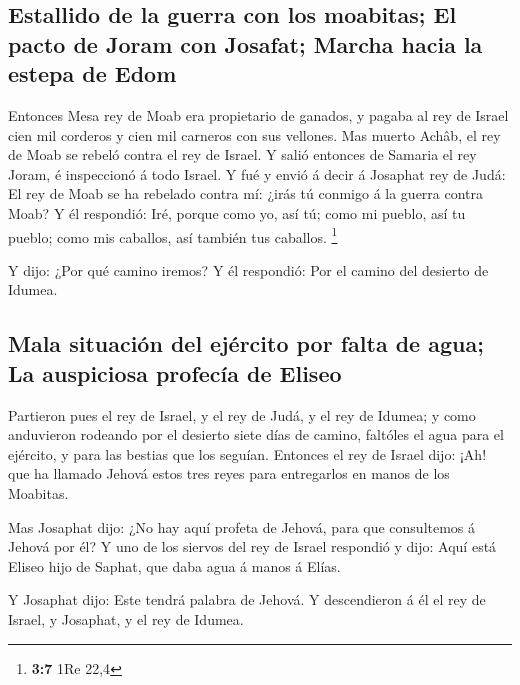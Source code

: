 \hypertarget{estallido-de-la-guerra-con-los-moabitas-el-pacto-de-joram-con-josafat-marcha-hacia-la-estepa-de-edom}{%
\subsection{Estallido de la guerra con los moabitas; El pacto de Joram
con Josafat; Marcha hacia la estepa de
Edom}\label{estallido-de-la-guerra-con-los-moabitas-el-pacto-de-joram-con-josafat-marcha-hacia-la-estepa-de-edom}}

 Entonces Mesa rey de Moab era propietario de ganados, y
pagaba al rey de Israel cien mil corderos y cien mil carneros con sus
vellones.  Mas muerto Achâb, el rey de Moab se rebeló
contra el rey de Israel.  Y salió entonces de Samaria el
rey Joram, é inspeccionó á todo Israel.  Y fué y envió á
decir á Josaphat rey de Judá: El rey de Moab se ha rebelado contra mí:
¿irás tú conmigo á la guerra contra Moab? Y él respondió: Iré, porque
como yo, así tú; como mi pueblo, así tu pueblo; como mis caballos, así
también tus caballos. \footnote{\textbf{3:7} 1Re 22,4}

 Y dijo: ¿Por qué camino iremos? Y él respondió: Por el
camino del desierto de Idumea.

\hypertarget{mala-situaciuxf3n-del-ejuxe9rcito-por-falta-de-agua-la-auspiciosa-profecuxeda-de-eliseo}{%
\subsection{Mala situación del ejército por falta de agua; La auspiciosa
profecía de
Eliseo}\label{mala-situaciuxf3n-del-ejuxe9rcito-por-falta-de-agua-la-auspiciosa-profecuxeda-de-eliseo}}

 Partieron pues el rey de Israel, y el rey de Judá, y el
rey de Idumea; y como anduvieron rodeando por el desierto siete días de
camino, faltóles el agua para el ejército, y para las bestias que los
seguían.  Entonces el rey de Israel dijo: ¡Ah! que ha
llamado Jehová estos tres reyes para entregarlos en manos de los
Moabitas.

 Mas Josaphat dijo: ¿No hay aquí profeta de Jehová, para
que consultemos á Jehová por él? Y uno de los siervos del rey de Israel
respondió y dijo: Aquí está Eliseo hijo de Saphat, que daba agua á manos
á Elías.

 Y Josaphat dijo: Este tendrá palabra de Jehová. Y
descendieron á él el rey de Israel, y Josaphat, y el rey de Idumea.

